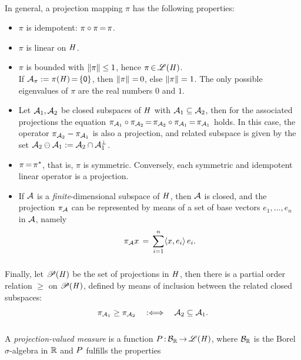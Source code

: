 \documentclass[11pt,twoside]{article}
\begin{document}
\paragraph*{}
In general,
a projection mapping $\pi$ has the following properties:

\begin{itemize}[leftmargin=12pt]
\item[1.]
$\pi$ is idempotent: $\pi \circ \pi {\,=\,} \pi$.

\item[2.]
$\pi$ is linear on $\mathit{H}$.

\item[3.]
$\pi$ is bounded with $\left\lVert \pi \right\rVert \leq 1$,
hence $\pi {\,\in\,} \mathscr{L}(\mathit{H})$.\\
If $\mathcal{A}_{\pi} := \pi(\mathit{H}) {\,=\,} \{{\mathsf{0}}\}$, then $\left\lVert \pi \right\rVert {\,=\,} 0$,
else $\left\lVert \pi \right\rVert=1$.
The only possible eigenvalues of $\pi$ are the real numbers $0$ and $1$.

\item[4.]
Let $\mathcal{A}_1,\mathcal{A}_2$ be closed subspaces of $\mathit{H}$
with $\mathcal{A}_1 \subseteq \mathcal{A}_2$,
then for the associated projections the equation
$\pi_{\mathcal{A}_1} \circ \pi_{\mathcal{A}_2} {\,=\,}
 \pi_{\mathcal{A}_2} \circ \pi_{\mathcal{A}_1} {\,=\,} \pi_{\mathcal{A}_1}$
holds.
In this case,
the operator $\pi_{\mathcal{A}_2} - \pi_{\mathcal{A}_1}$ is also a projection,
and related subspace is given by the set
$\mathcal{A}_2 \ominus \mathcal{A}_1 := \mathcal{A}_2 \cap \mathcal{A}_1^{\bot}$.

\item[5.]
$\pi {\,=\,} \pi^{*}$, that is, $\pi$ is symmetric.
Conversely,
each symmetric and idempotent linear operator
is a projection.

\item[6.]
If $\mathcal{A}$ is a \textit{finite}-dimensional subspace of $\mathit{H}$,
then $\mathcal{A}$ is closed,
and the projection $\pi_{\mathcal{A}}$ can be represented
by means of a set of base vectors $e_1,\ldots,e_n$ in $\mathcal{A}$, namely
\[
\pi_{\mathcal{A}} x \,=\, \sum_{i=1}^n \langle x,e_i \rangle \, e_i.
\]
\end{itemize}

\subparagraph*{}
Finally,
let $\mathscr{P}(\mathit{H})$ be the set of projections in $\mathit{H}$,
then there is a partial order relation $\geq$ on $\mathscr{P}(\mathit{H})$,
defined by means of inclusion between the related closed subspaces:
\[
\pi_{\mathcal{A}_1} \geq \pi_{\mathcal{A}_2} \quad
: \Longleftrightarrow \quad \mathcal{A}_2 \subseteq \mathcal{A}_1.
\]

\subparagraph*{}
A \textit{projection-valued measure} is a function
${P} {\,:\,} {\mathcal{B}}_{{\mathbb{R}}} {\,\to\,} \mathscr{L}(\mathit{H})$,
where ${\mathcal{B}}_{{\mathbb{R}}}$ is the Borel $\sigma$-algebra in ${\mathbb{R}}$
and ${P}$ fulfills the properties
\end{document}

